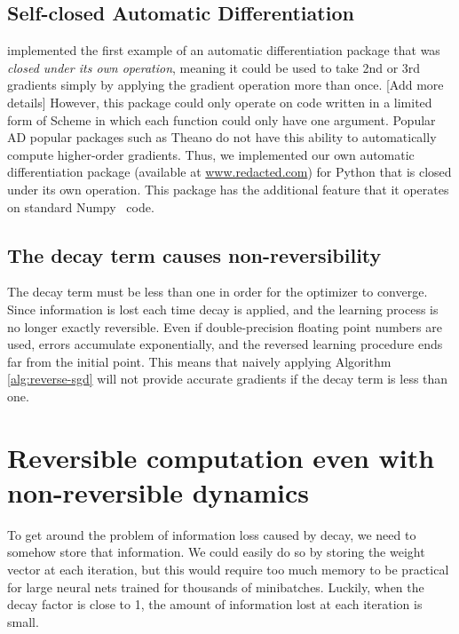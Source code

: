\documentclass{article}
\begin{document}
\subsection{Self-closed Automatic Differentiation}
\citet{pearlmutter2008reverse} implemented the first example of an automatic differentiation package that was \emph{closed under its own operation}, meaning it could be used to take 2nd or 3rd gradients simply by applying the gradient operation more than once. [Add more details]
However, this package could only operate on code written in a limited form of Scheme in which each function could only have one argument.
Popular AD popular packages such as Theano do not have this ability to automatically compute higher-order gradients.
Thus, we implemented our own automatic differentiation package (available at \url{www.redacted.com}) for Python that is closed under its own operation.
This package has the additional feature that it operates on standard Numpy~\cite{oliphant2007python} code.

\subsection{The decay term causes non-reversibility}
The decay term must be less than one in order for the optimizer to converge.
Since information is lost each time decay is applied, and the learning process is no longer exactly reversible.
Even if double-precision floating point numbers are used, errors accumulate exponentially, and the reversed learning procedure ends far from the initial point.
This means that naively applying Algorithm \ref{alg:reverse-sgd} will not provide accurate gradients if the decay term is less than one.

\section{Reversible computation even with non-reversible dynamics}

To get around the problem of information loss caused by decay, we need to somehow store that information.
We could easily do so by storing the weight vector at each iteration, but this would require too much memory to be practical for large neural nets trained for thousands of minibatches.
Luckily, when the decay factor is close to 1, the amount of information lost at each iteration is small.
\end{document}
